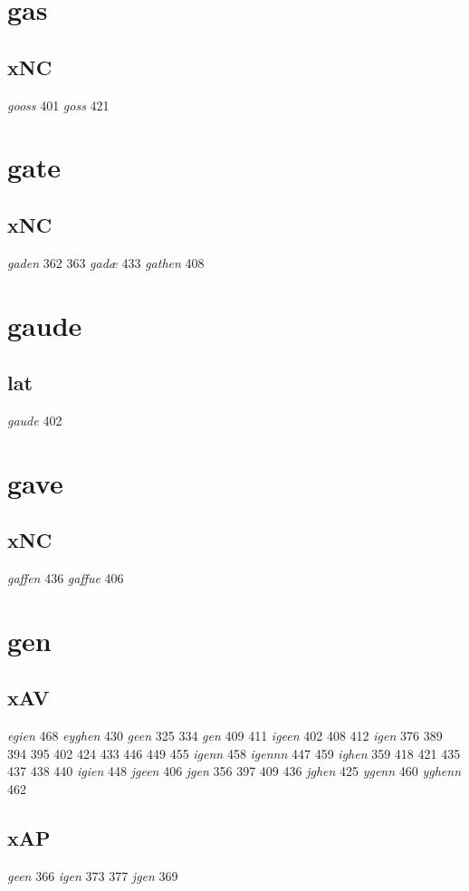 \documentclass[a4paper,twocolumn]{article}
\begin{document}
\section{gas}
\label{sec:org71bc627}
\subsection{xNC}
\label{sec:org941810b}
\emph{gooss} 401 \emph{goss} 421 
\section{gate}
\label{sec:org3fc692f}
\subsection{xNC}
\label{sec:org37f5db9}
\emph{gaden} 362 363 \emph{gadæ} 433 \emph{gathen} 408 
\section{gaude}
\label{sec:orgb9935ed}
\subsection{lat}
\label{sec:orgdd5496f}
\emph{gaude} 402 
\section{gave}
\label{sec:org9396730}
\subsection{xNC}
\label{sec:orgb0cb9db}
\emph{gaffen} 436 \emph{gaffue} 406 
\section{gen}
\label{sec:org4f55e32}
\subsection{xAV}
\label{sec:orgb50a9bf}
\emph{egien} 468 \emph{eyghen} 430 \emph{geen} 325 334 \emph{gen} 409 411 \emph{igeen} 402 408 412 \emph{igen} 376 389 394 395 402 424 433 446 449 455 \emph{igenn} 458 \emph{igennn} 447 459 \emph{ighen} 359 418 421 435 437 438 440 \emph{igien} 448 \emph{jgeen} 406 \emph{jgen} 356 397 409 436 \emph{jghen} 425 \emph{ygenn} 460 \emph{yghenn} 462 
\subsection{xAP}
\label{sec:org1c8e54d}
\emph{geen} 366 \emph{igen} 373 377 \emph{jgen} 369 
\end{document}
